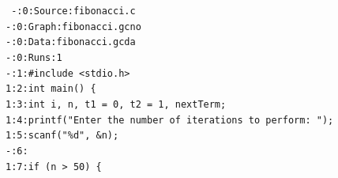 \documentclass [11pt, a4wide, twoside]{article}
\begin{document}
\texttt{
\hspace*{0.925cm}-:\hspace*{0.74cm}0:\hspace*{0.75cm}Source:fibonacci.c\\
\hspace*{0.925cm}-:\hspace*{0.74cm}0:\hspace*{0.75cm}Graph:fibonacci.gcno\\
\hspace*{0.925cm}-:\hspace*{0.74cm}0:\hspace*{0.75cm}Data:fibonacci.gcda\\
\hspace*{0.925cm}-:\hspace*{0.74cm}0:\hspace*{0.75cm}Runs:1\\
\hspace*{0.925cm}-:\hspace*{0.74cm}1:\hspace*{0.75cm}\#include \textless stdio.h\textgreater\\
\hspace*{0.925cm}1:\hspace*{0.74cm}2:\hspace*{0.75cm}int main() \{\\
\hspace*{0.925cm}1:\hspace*{0.74cm}3:\hspace*{0.75cm}\hspace*{0.5cm}int i, n, t1 = 0, t2 = 1, nextTerm;\\
\hspace*{0.925cm}1:\hspace*{0.74cm}4:\hspace*{0.75cm}\hspace*{0.5cm}printf("Enter the number of iterations to perform: ");\\
\hspace*{0.925cm}1:\hspace*{0.74cm}5:\hspace*{0.75cm}\hspace*{0.5cm}scanf("\%d", \&n);\\
\hspace*{0.925cm}-:\hspace*{0.74cm}6:\\
\hspace*{0.925cm}1:\hspace*{0.74cm}7:\hspace*{0.75cm}\hspace*{0.5cm}if (n \textgreater~50) \{\\
}
\end{document}
